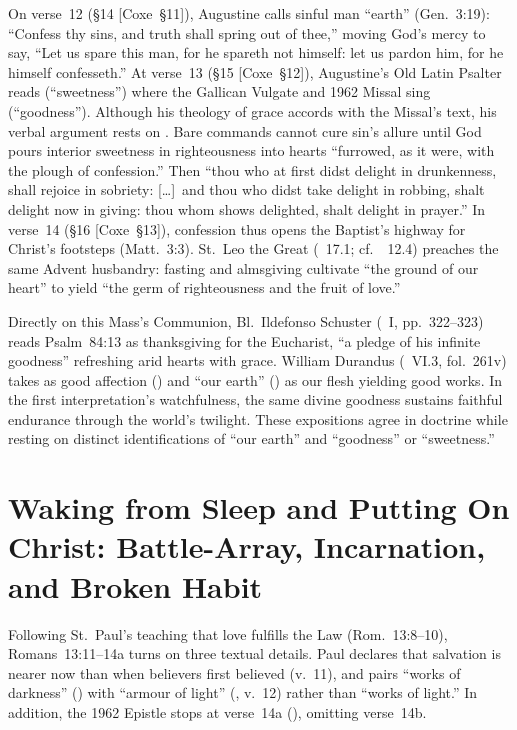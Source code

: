 On verse~12 (\S14 [Coxe~\S11]), Augustine calls sinful man ``earth'' (Gen.~3:19): ``Confess thy sins, and truth shall spring out of thee,'' moving God's mercy to say, ``Let us spare this man, for he spareth not himself: let us pardon him, for he himself confesseth.'' At verse~13 (\S15 [Coxe~\S12]), Augustine's Old Latin Psalter reads  (``sweetness'') where the Gallican Vulgate and 1962 Missal sing  (``goodness''). Although his theology of grace accords with the Missal's text, his verbal argument rests on . Bare commands cannot cure sin's allure until God pours interior sweetness in righteousness into hearts ``furrowed, as it were, with the plough of confession.'' Then ``thou who at first didst delight in drunkenness, shall rejoice in sobriety: [\dots]\ and thou who didst take delight in robbing, shalt delight now in giving: thou whom shows delighted, shalt delight in prayer.'' In verse~14 (\S16 [Coxe~\S13]), confession thus opens the Baptist's highway for Christ's footsteps (Matt.~3:3). St.~Leo the Great (~17.1; cf.~~12.4) preaches the same Advent husbandry: fasting and almsgiving cultivate ``the ground of our heart'' to yield ``the germ of righteousness and the fruit of love.''

Directly on this Mass's Communion, Bl.~Ildefonso Schuster (~I, pp.~322--323) reads Psalm~84:13 as thanksgiving for the Eucharist, ``a pledge of his infinite goodness'' refreshing arid hearts with grace. William Durandus (~VI.3, fol.~261v) takes  as good affection () and ``our earth'' () as our flesh yielding good works. In the first interpretation's watchfulness, the same divine goodness sustains faithful endurance through the world's twilight. These expositions agree in doctrine while resting on distinct identifications of ``our earth'' and ``goodness'' or ``sweetness.''

\section{Waking from Sleep and Putting On Christ: Battle-Array, Incarnation, and Broken Habit}

Following St.~Paul's teaching that love fulfills the Law (Rom.~13:8--10), Romans~13:11--14a turns on three textual details. Paul declares that salvation is nearer now than when believers first believed (v.~11), and pairs ``works of darkness'' () with ``armour of light'' (, v.~12) rather than ``works of light.'' In addition, the 1962 Epistle stops at verse~14a (), omitting verse~14b.

